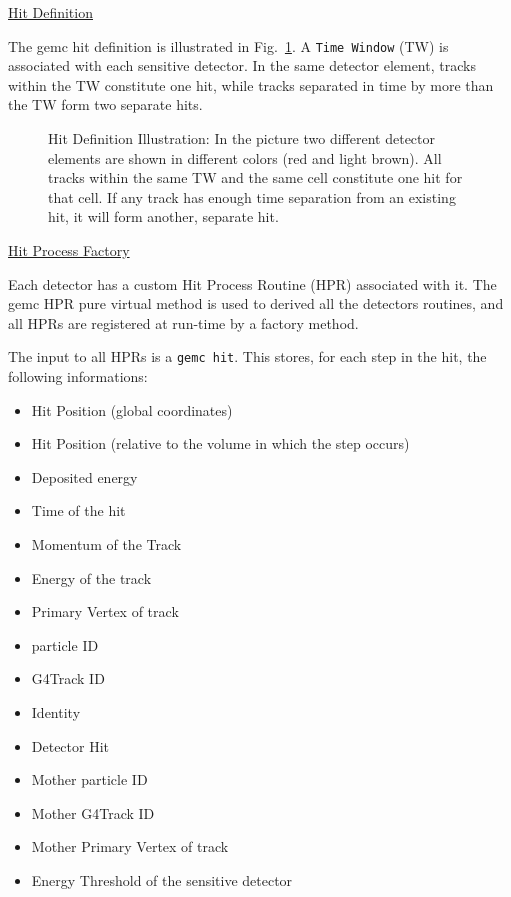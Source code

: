 \vskip 0.5cm
\underline{Hit Definition}
\vskip 0.5cm

\noindent
The gemc hit definition is illustrated in Fig.~\ref{fig:hit_def}. A {\tt Time Window} (TW)
is associated with each sensitive detector. In the same detector element, tracks within
the TW constitute one hit, while tracks separated in time by more than the TW form two 
separate hits.

\vskip 1cm
\begin{figure}[h]
\begin{center}
\caption{\small{Hit Definition Illustration: In the picture two different detector elements 
               are shown in different colors (red and light brown). All tracks within the same TW
               and the same cell constitute one hit for that cell.
               If any track has enough time separation from an existing hit, it will form another, separate hit.  }}
\label{fig:hit_def}
\end{center}
\end{figure}
\clearpage\newpage


\vskip 1.0cm
\underline{Hit Process Factory}
\vskip 0.5cm

\noindent
Each detector has a custom Hit Process Routine (HPR) associated with it. The gemc HPR pure virtual method is
used to derived all the detectors routines, and all HPRs are registered at run-time
by a factory method.

The input to all HPRs is a {\tt gemc hit}. This stores, for each step in the hit, the following informations:
\vskip 0.5cm
\begin{itemize}
\item Hit Position (global coordinates)
\item Hit Position (relative to the volume in which the step occurs)
\item Deposited energy
\item Time of the hit
\item Momentum of the Track
\item Energy of the track
\item Primary Vertex of track
\item particle ID
\item G4Track ID
\item Identity
\item Detector Hit
\item Mother particle ID
\item Mother G4Track ID
\item Mother Primary Vertex of track
\item Energy Threshold of the sensitive detector
\end{itemize}

